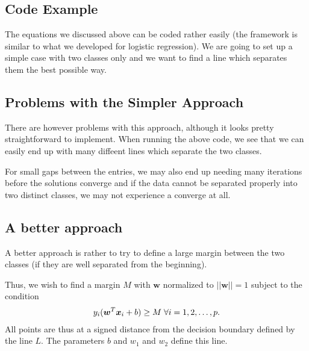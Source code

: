 \documentclass[letterpaper,10pt,english]{sphinxmanual}
\begin{document}
\subsection{Code Example}
\label{\detokenize{chapter7:code-example}}
The equations we discussed above can be coded rather easily (the
framework is similar to what we developed for logistic
regression). We are going to set up a simple case with two classes only and we want to find a line which separates them the best possible way.


\subsection{Problems with the Simpler Approach}
\label{\detokenize{chapter7:problems-with-the-simpler-approach}}
There are however problems with this approach, although it looks
pretty straightforward to implement. When running the above code, we see that we can easily end up with many diffeent lines which separate the two classes.

For small
gaps between the entries, we may also end up needing many iterations
before the solutions converge and if the data cannot be separated
properly into two distinct classes, we may not experience a converge
at all.


\subsection{A better approach}
\label{\detokenize{chapter7:a-better-approach}}
A better approach is rather to try to define a large margin between
the two classes (if they are well separated from the beginning).

Thus, we wish to find a margin \(M\) with \(\boldsymbol{w}\) normalized to
\(\vert\vert \boldsymbol{w}\vert\vert =1\) subject to the condition
\begin{equation*}
\begin{split}
y_i(\boldsymbol{w}^T\boldsymbol{x}_i+b) \geq M \hspace{0.1cm}\forall i=1,2,\dots, p.
\end{split}
\end{equation*}
All points are thus at a signed distance from the decision boundary defined by the line \(L\). The parameters \(b\) and \(w_1\) and \(w_2\) define this line.
\end{document}
